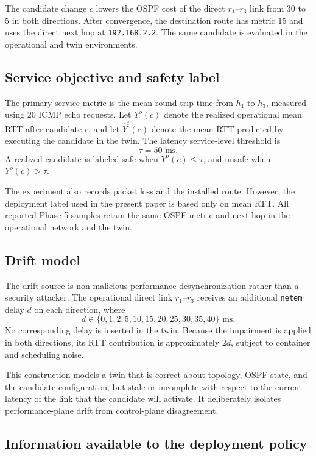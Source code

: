 The candidate change $c$ lowers the OSPF cost of the direct $r_1$--$r_3$ link from 30 to 5 in both directions. After convergence, the destination route has metric 15 and uses the direct next hop at \texttt{192.168.2.2}. The same candidate is evaluated in the operational and twin environments.

\subsection{Service objective and safety label}

The primary service metric is the mean round-trip time from $h_1$ to $h_3$, measured using 20 ICMP echo requests. Let $Y^o(c)$ denote the realized operational mean RTT after candidate $c$, and let $\widehat{Y}^{t}(c)$ denote the mean RTT predicted by executing the candidate in the twin. The latency service-level threshold is
\[
\tau = 50\text{ ms}.
\]
A realized candidate is labeled safe when $Y^o(c)\le \tau$, and unsafe when $Y^o(c)>\tau$.

The experiment also records packet loss and the installed route. However, the deployment label used in the present paper is based only on mean RTT. All reported Phase 5 samples retain the same OSPF metric and next hop in the operational network and the twin.

\subsection{Drift model}

The drift source is non-malicious performance desynchronization rather than a security attacker. The operational direct link $r_1$--$r_3$ receives an additional \texttt{netem} delay $d$ on each direction, where
\[
d\in\{0,1,2,5,10,15,20,25,30,35,40\}\text{ ms}.
\]
No corresponding delay is inserted in the twin. Because the impairment is applied in both directions, its RTT contribution is approximately $2d$, subject to container and scheduling noise.

This construction models a twin that is correct about topology, OSPF state, and the candidate configuration, but stale or incomplete with respect to the current latency of the link that the candidate will activate. It deliberately isolates performance-plane drift from control-plane disagreement.

\subsection{Information available to the deployment policy}


